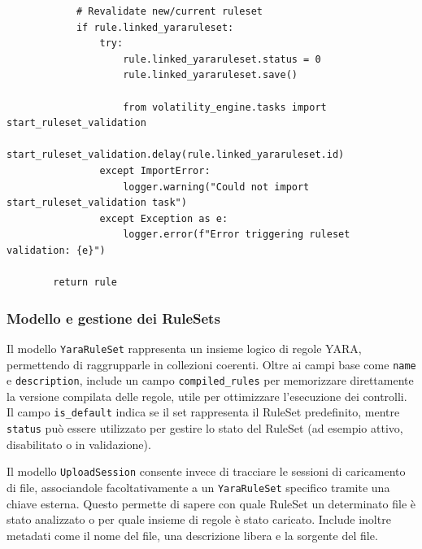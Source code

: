 \begin{verbatim}
            # Revalidate new/current ruleset
            if rule.linked_yararuleset:
                try:
                    rule.linked_yararuleset.status = 0
                    rule.linked_yararuleset.save()
                    
                    from volatility_engine.tasks import start_ruleset_validation
                    start_ruleset_validation.delay(rule.linked_yararuleset.id)
                except ImportError:
                    logger.warning("Could not import start_ruleset_validation task")
                except Exception as e:
                    logger.error(f"Error triggering ruleset validation: {e}")
        
        return rule
\end{verbatim}

\subsubsection{Modello e gestione dei RuleSets}
Il modello \texttt{YaraRuleSet} rappresenta un insieme logico di regole YARA, permettendo di raggrupparle in collezioni coerenti. Oltre ai campi base come \texttt{name} e \texttt{description}, include un campo \texttt{compiled\_rules} per memorizzare direttamente la versione compilata delle regole, utile per ottimizzare l'esecuzione dei controlli. Il campo \texttt{is\_default} indica se il set rappresenta il RuleSet predefinito, mentre \texttt{status} può essere utilizzato per gestire lo stato del RuleSet (ad esempio attivo, disabilitato o in validazione).

Il modello \texttt{UploadSession} consente invece di tracciare le sessioni di caricamento di file, associandole facoltativamente a un \texttt{YaraRuleSet} specifico tramite una chiave esterna. Questo permette di sapere con quale RuleSet un determinato file è stato analizzato o per quale insieme di regole è stato caricato. Include inoltre metadati come il nome del file, una descrizione libera e la sorgente del file.

